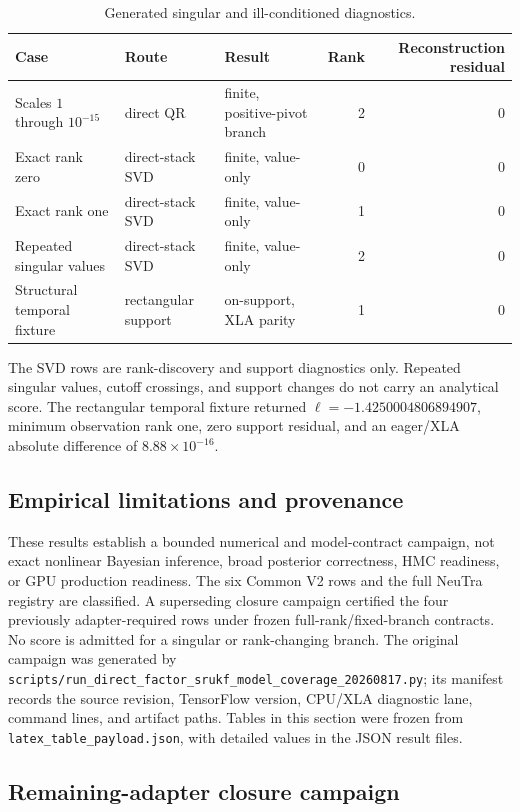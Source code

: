 \documentclass[11pt]{article}
\begin{document}
\begin{table}[ht]
\centering
\caption{Generated singular and ill-conditioned diagnostics.}
\label{tab:singular-robustness}
\begin{tabular}{lllrr}
\toprule
Case & Route & Result & Rank & Reconstruction residual \\
\midrule
Scales $1$ through $10^{-15}$ & direct QR & finite, positive-pivot branch & 2 & $0$ \\
Exact rank zero & direct-stack SVD & finite, value-only & 0 & $0$ \\
Exact rank one & direct-stack SVD & finite, value-only & 1 & $0$ \\
Repeated singular values & direct-stack SVD & finite, value-only & 2 & $0$ \\
Structural temporal fixture & rectangular support & on-support, XLA parity & 1 & $0$ \\
\bottomrule
\end{tabular}
\end{table}

The SVD rows are rank-discovery and support diagnostics only. Repeated
singular values, cutoff crossings, and support changes do not carry an
analytical score. The rectangular temporal fixture returned
$\ell=-1.4250004806894907$, minimum observation rank one, zero support
residual, and an eager/XLA absolute difference of
$8.88\times10^{-16}$.

\subsection{Empirical limitations and provenance}

These results establish a bounded numerical and model-contract campaign, not
exact nonlinear Bayesian inference, broad posterior correctness, HMC
readiness, or GPU production readiness. The six Common V2 rows and the full
NeuTra registry are classified. A superseding closure campaign certified the
four previously adapter-required rows under frozen full-rank/fixed-branch
contracts. No score is admitted for a singular or rank-changing branch. The
original campaign was generated by
\texttt{scripts/run\_direct\_factor\_srukf\_model\_coverage\_20260817.py}; its
manifest records the source revision, TensorFlow version, CPU/XLA diagnostic
lane, command lines, and artifact paths. Tables in this section were frozen
from \texttt{latex\_table\_payload.json}, with detailed values in the JSON
result files.

\subsection{Remaining-adapter closure campaign}
\label{sec:remaining-adapter-closure}
\end{document}
